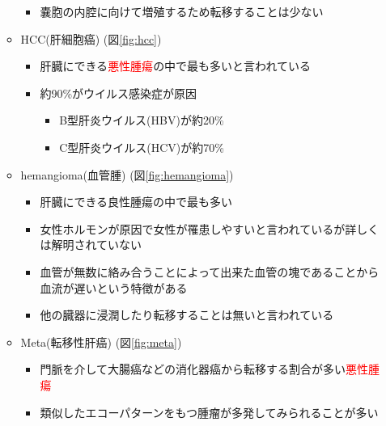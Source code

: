 \documentclass[a4j]{ujarticle}
\newcommand{\Fref}[1]{\mbox{図\ref{fig:#1}}}
\begin{document}
\begin{itemize}
\begin{itemize}
\begin{itemize}
                    \item 嚢胞の内腔に向けて増殖するため転移することは少ない
                \end{itemize}
                \item HCC(肝細胞癌) (\Fref{hcc})
                \begin{itemize}
                    \item 肝臓にできる\textcolor{red}{悪性腫瘍}の中で最も多いと言われている
                    \item 約90\%がウイルス感染症が原因
                    \begin{itemize}
                        \item B型肝炎ウイルス(HBV)が約20\%
                        \item C型肝炎ウイルス(HCV)が約70\%
                    \end{itemize}
                \end{itemize}
                \item hemangioma(血管腫) (\Fref{hemangioma})
                \begin{itemize}
                    \item 肝臓にできる良性腫瘍の中で最も多い
                    \item 女性ホルモンが原因で女性が罹患しやすいと言われているが詳しくは解明されていない
                    \item 血管が無数に絡み合うことによって出来た血管の塊であることから血流が遅いという特徴がある
                    \item 他の臓器に浸潤したり転移することは無いと言われている
                \end{itemize}
                \item Meta(転移性肝癌) (\Fref{meta})
                \begin{itemize}
                    \item 門脈を介して大腸癌などの消化器癌から転移する割合が多い\textcolor{red}{悪性腫瘍}
                    \item 類似したエコーパターンをもつ腫瘤が多発してみられることが多い
                \end{itemize}
            \end{itemize}
        \end{itemize}
\end{document}
